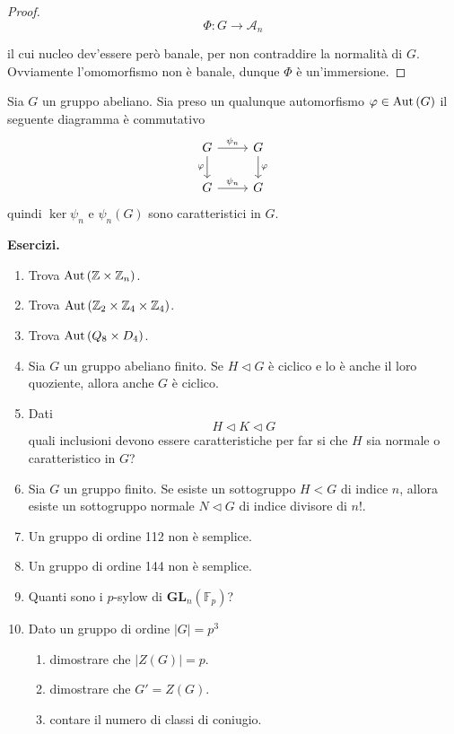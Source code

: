 \begin{multicols}{2}
\begin{proof}
		\[ \Phi \colon G \to \mathcal{A}_n \]
		
		il cui nucleo dev'essere però banale, per non contraddire la normalità di $ G $. Ovviamente l'omomorfismo non è banale, dunque $ \Phi $ è un'immersione.
	\end{proof}
	
	
	\begin{remark}
		Sia $ G $ un gruppo abeliano. Sia  preso un qualunque automorfismo $ \varphi \in \mathrm{Aut}\left( G \right) $ il seguente diagramma è commutativo
		\[ \begin{tikzcd}
		G \arrow{r}{\psi _n} \arrow[swap]{d}{\varphi} & G \arrow{d}{\varphi} \\
		G \arrow{r}{\psi _n} & G
		\end{tikzcd}
		\]
		quindi $ \ker\psi _n $ e $ \psi _n(G) $ sono caratteristici in $ G $. \\
		
	\end{remark}
	
	\textbf{Esercizi.}
	\begin{enumerate}
		\item Trova $ \mathrm{Aut}\left( \mathbb{Z}\times\mathbb{Z}_n \right) $.
		\item Trova $ \mathrm{Aut}\left( \mathbb{Z}_2\times\mathbb{Z}_4\times\mathbb{Z}_4 \right) $.
		\item Trova $ \mathrm{Aut}\left( Q_8 \times D_4 \right) $.
		\item Sia $ G $ un gruppo abeliano finito. Se $ H \lhd G $ è ciclico e lo è anche il loro quoziente, allora anche $ G $ è ciclico.
		\item Dati $$  H \lhd K \lhd G  $$ quali inclusioni devono essere caratteristiche per far si che $ H $ sia normale o caratteristico in $ G $?
		
		\item Sia $ G $ un gruppo finito. Se esiste un sottogruppo $ H < G $ di indice $ n $, allora esiste un sottogruppo normale $ N \lhd G $ di indice divisore di $ n! $.
		
		\item Un gruppo di ordine 112 non è semplice.
		
		\item Un gruppo di ordine 144 non è semplice.
		
		\item Quanti sono i $ p $-sylow di $ \textbf{GL}_n(\mathbb{F}_p) $?
		
		\item Dato un gruppo di ordine $ |G|= p^3 $
		\begin{enumerate}
			\item dimostrare che $ |Z(G)| = p $.
			\item dimostrare che $ G' = Z(G) $.
			\item contare il numero di classi di coniugio.
		\end{enumerate}
		

\end{enumerate}
\end{multicols}
